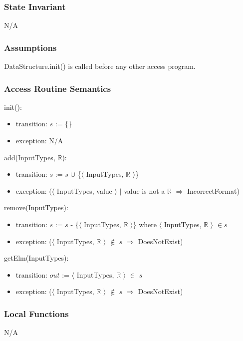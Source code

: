 \documentclass[12pt, titlepage]{article}
\begin{document}
\subsubsection{State Invariant}
N/A

\subsubsection{Assumptions}

DataStructure.init() is called before any other access program.

\subsubsection{Access Routine Semantics}

\noindent init():
\begin{itemize}
	\item transition: $s$ := \{\}
	\item exception: N/A
\end{itemize}

\noindent add(InputTypes, $\mathbb{R}$):
\begin{itemize}
	\item transition: $s$ := $s$ $\cup$ \{$\langle$ InputTypes, $\mathbb{R}$ $\rangle$\}
	\item exception: ($\langle$ InputTypes, value $\rangle$ $|$ value is not a $\mathbb{R}$ $\Rightarrow$ IncorrectFormat) 
\end{itemize}

\noindent remove(InputTypes):
\begin{itemize}
	\item transition: $s$ := $s$ - \{$\langle$ InputTypes, $\mathbb{R}$ $\rangle$\} where $\langle$ InputTypes, $\mathbb{R}$ $\rangle$ $\in $$s$
	\item exception: ($\langle$ InputTypes, $\mathbb{R}$ $\rangle$ $\notin$ $s$ $\Rightarrow$ DoesNotExist)
\end{itemize}

\noindent getElm(InputTypes):
\begin{itemize}
	\item transition: $out$ := $\langle$ InputTypes, $\mathbb{R}$ $\rangle$ $\in$ $s$
	\item exception: ($\langle$ InputTypes, $\mathbb{R}$ $\rangle$ $\notin$ $s$ $\Rightarrow$ DoesNotExist)
\end{itemize}

\subsubsection{Local Functions}
N/A
\end{document}
